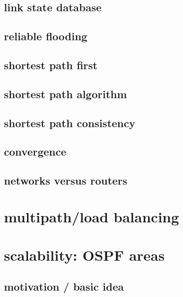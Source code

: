 \subsection{link state database}

\subsection{reliable flooding}


\subsection{shortest path first}



\subsection{shortest path algorithm}


\subsection{shortest path consistency}


\subsection{convergence}


\subsection{networks versus routers}
 

\section{multipath/load balancing}


\section{scalability: OSPF areas} %

\subsection{motivation / basic idea}

